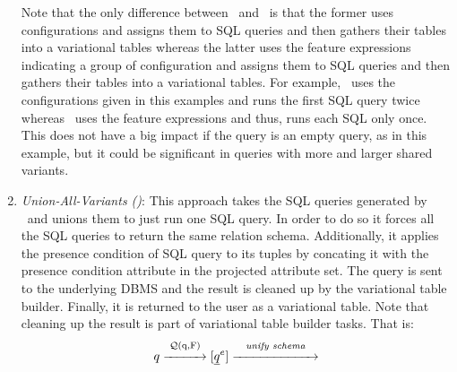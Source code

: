 \begin{enumerate}
\begin{example}
%
Note that the only difference between \nbf\ and \ubf\ is that the former uses configurations
and assigns them to SQL queries and then gathers their tables into a variational tables 
whereas the latter uses the feature expressions indicating a group of configuration and
assigns them to  SQL queries and then gathers their tables into a variational tables. 
For example, \nbf\ uses the configurations given in this examples and runs the first SQL
query twice whereas \ubf\ uses the feature expressions and thus, runs each SQL only 
once. This does not have a big impact if the query is an empty query, as in this example,
but it could be significant in queries with more and larger shared variants. 
\end{example}
%
\item
\emph{Union-All-Variants (\uav)}:
This approach takes the SQL queries generated by \ubf\ and 
unions them to just run one SQL query. In order to do so it 
forces all the SQL queries to return the same relation schema.
Additionally, it applies the presence condition of  SQL query
to its tuples by concating it with the presence condition attribute
in the projected attribute set.
The query is sent to the underlying
DBMS and the result is cleaned up by the variational table builder. Finally, it is 
returned to the user as a variational table. Note that cleaning up
the result is part of variational table builder tasks.
That is:
%
\[\vQ \mathrel{\mathop{\xrightarrow{\hspace*{1cm}}}^{\mathrm{\qGroup \vQ}}} [ \annot [\dimMeta] {\pQ} ] 
\mathrel{\mathop{\xrightarrow{\hspace*{2.2cm}}}^{\mathrm{\textit{unify schema}}}
}\]
\end{enumerate}
